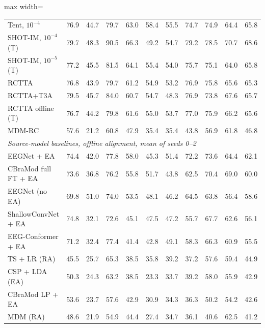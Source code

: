 \documentclass[preprint,12pt]{elsarticle}
\begin{document}
\begin{table}[!htbp]
\begin{adjustbox}{max width=\textwidth}
\begin{tabular}{@{}l ccccccccc c@{}}
Tent, $10^{-4}$ & 76.9 & 44.7 & 79.7 & 63.0 & 58.4 & 55.5 & 74.7 & 74.9 & 64.4 & 65.8 \\
SHOT-IM, $10^{-4}$ (T) & 79.7 & 48.3 & 90.5 & 66.3 & 49.2 & 54.7 & 79.2 & 78.5 & 70.7 & 68.6 \\
SHOT-IM, $10^{-5}$ (T) & 77.2 & 45.5 & 81.5 & 64.1 & 55.4 & 54.0 & 75.7 & 75.1 & 64.0 & 65.8 \\
RCTTA & 76.8 & 43.9 & 79.7 & 61.2 & 54.9 & 53.2 & 76.9 & 75.8 & 65.6 & 65.3 \\
RCTTA+T3A & 79.5 & 45.7 & 84.0 & 60.7 & 54.7 & 48.3 & 76.9 & 73.8 & 67.6 & 65.7 \\
RCTTA offline (T) & 76.7 & 44.2 & 79.8 & 61.6 & 55.0 & 53.7 & 77.0 & 75.9 & 66.2 & 65.6 \\
MDM-RC & 57.6 & 21.2 & 60.8 & 47.9 & 35.4 & 35.4 & 43.8 & 56.9 & 61.8 & 46.8 \\
\midrule
\multicolumn{11}{l}{\textit{Source-model baselines, offline alignment, mean of seeds 0--2}}\\
EEGNet + EA & 74.4 & 42.0 & 77.8 & 58.0 & 45.3 & 51.4 & 72.2 & 73.6 & 64.4 & 62.1 \\
CBraMod full FT + EA & 73.6 & 36.8 & 76.2 & 55.8 & 51.7 & 43.8 & 62.5 & 70.4 & 69.0 & 60.0 \\
EEGNet (no EA) & 69.8 & 51.0 & 74.0 & 53.5 & 48.1 & 46.2 & 64.5 & 63.8 & 56.4 & 58.6 \\
ShallowConvNet + EA & 74.8 & 32.1 & 72.6 & 45.1 & 47.5 & 47.2 & 55.7 & 67.7 & 62.6 & 56.1 \\
EEG-Conformer + EA & 71.2 & 32.4 & 77.4 & 41.4 & 42.8 & 49.1 & 58.3 & 66.3 & 60.9 & 55.5 \\
TS + LR (RA) & 45.5 & 25.7 & 65.3 & 38.5 & 35.8 & 39.2 & 37.2 & 57.6 & 59.4 & 44.9 \\
CSP + LDA (EA) & 50.3 & 24.3 & 63.2 & 38.5 & 23.3 & 33.7 & 39.2 & 58.0 & 55.9 & 42.9 \\
CBraMod LP + EA & 53.6 & 23.7 & 57.6 & 42.9 & 30.9 & 34.3 & 36.3 & 50.2 & 54.2 & 42.6 \\
MDM (RA) & 48.6 & 21.9 & 54.9 & 44.4 & 27.4 & 34.7 & 36.1 & 40.6 & 62.5 & 41.2 \\
\bottomrule
\end{tabular}
\end{adjustbox}
\end{table}






\end{document}
